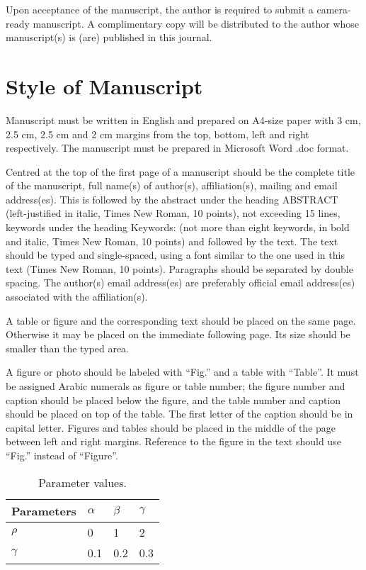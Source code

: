 \documentclass[10pt,a4paper]{mjcs}
\begin{document}
Upon acceptance of the manuscript, the author is required to submit a camera-ready manuscript. A complimentary copy will be distributed to the author whose manuscript(s) is (are) published in this journal.


\section{Style of Manuscript}
Manuscript must be written in English and prepared on A4-size paper with 3 cm, 2.5 cm, 2.5 cm and 2 cm margins from the top, bottom, left and right respectively. The manuscript must be prepared in Microsoft Word .doc format.

Centred at the top of the first page of a manuscript should be the complete title of the manuscript, full name(s) of author(s), affiliation(s), mailing and email address(es). This is followed by the abstract under the heading ABSTRACT (left-justified in italic, Times New Roman, 10 points), not exceeding 15 lines, keywords under the heading Keywords: (not more than eight keywords, in bold and italic, Times New Roman, 10 points) and followed by the text. The text should be typed and single-spaced, using a font similar to the one used in this text (Times New Roman, 10 points). Paragraphs should be separated by double spacing. The author(s) email address(es) are preferably official email address(es) associated with the affiliation(s).

A table or figure and the corresponding text should be placed on the same page. Otherwise it may be placed on the immediate following page. Its size should be smaller than the typed area.

A figure or photo should be labeled with “Fig.” and a table with “Table”. It must be assigned Arabic numerals as figure or table number; the figure number and caption should be placed below the figure, and the table number and caption should be placed on top of the table. The first letter of the caption should be in capital letter. Figures and tables should be placed in the middle of the page between left and right margins. Reference to the figure in the text should use “Fig.” instead of “Figure”.

\begin{table}[htbp]
\caption{Parameter values.}
\begin{center}
\begin{tabular}{|l|l|l|l|}
\hline
Parameters & $\alpha$ & $\beta$ & $\gamma$ \\
\hline
$\rho$ & 0 & 1 & 2 \\

$\gamma$ & 0.1 & 0.2 & 0.3 \\
\hline
\end{tabular}
\end{center}
\label{parameter_values}
\end{table}
\end{document}
